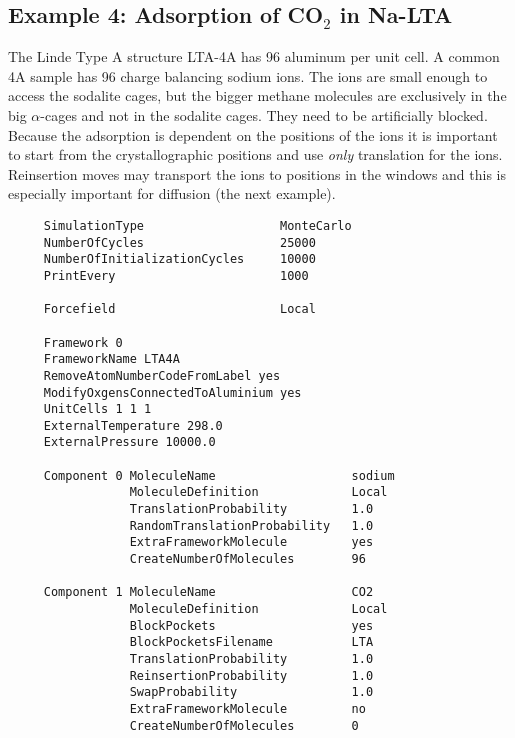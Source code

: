 \subsection*{Example 4: Adsorption of CO$_2$ in Na-LTA}

The Linde Type A structure LTA-4A has 96 aluminum per unit cell. A common 4A sample has 96 charge balancing sodium ions.
The ions are small enough to access the sodalite cages, but the bigger methane molecules are exclusively in the big $\alpha$-cages
and not in the sodalite cages. They need to be artificially blocked.
Because the adsorption is dependent on the positions of the ions it is
important to start from the crystallographic positions and use \emph{only} translation for the ions. Reinsertion moves may transport the ions
to positions in the windows and this is especially important for diffusion (the next example).

\begin{tiny}
\begin{verbatim}
     SimulationType                   MonteCarlo
     NumberOfCycles                   25000
     NumberOfInitializationCycles     10000
     PrintEvery                       1000

     Forcefield                       Local

     Framework 0
     FrameworkName LTA4A
     RemoveAtomNumberCodeFromLabel yes
     ModifyOxgensConnectedToAluminium yes
     UnitCells 1 1 1
     ExternalTemperature 298.0
     ExternalPressure 10000.0

     Component 0 MoleculeName                   sodium
                 MoleculeDefinition             Local
                 TranslationProbability         1.0
                 RandomTranslationProbability   1.0
                 ExtraFrameworkMolecule         yes
                 CreateNumberOfMolecules        96

     Component 1 MoleculeName                   CO2
                 MoleculeDefinition             Local
                 BlockPockets                   yes
                 BlockPocketsFilename           LTA
                 TranslationProbability         1.0
                 ReinsertionProbability         1.0
                 SwapProbability                1.0
                 ExtraFrameworkMolecule         no
                 CreateNumberOfMolecules        0
\end{verbatim}
\end{tiny}

